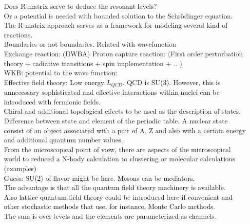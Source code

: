 \documentclass[openany]{book}
\begin{document}
Does R-matrix serve to deduce the resonant levels?  \\

Or a potential is needed with bounded solution to the Schrödinger equation.   \\

The R-matrix approach serves as a framework for modeling several kind of reactions.  \\

Boundaries or not boundaries. Related with wavefunction  \\

Exchange reaction: (DWBA)
Proton capture reaction: (First order perturbation theory + radiative transitions + spin implementation + .. ) \\

WKB: potential to the wave function: \\

Effective field theory: Low energy $L_{QCD}$. 
QCD is SU(3). However, this is unnecessary sophisticated and effective interactions within nuclei can be introduced with fermionic fields.  \\

Chiral and additional topological effects to be used as the description of states. \\
 
Difference between state and element of the periodic table. A nuclear state consist of an object associated with a pair of A, Z and also  with a certain energy and additional quantum number values. \\

From the microscopical point of view, there are aspects of the microscopical world to reduced a N-body calculation to  clustering or molecular calculations (examples) \\

Guess: SU(2) of flavor might be here. Mesons can be mediators. \\

The advantage is that all the quantum field theory machinery is available. \\

Also lattice quantum field theory could be introduced here if convenient and other stochastic methods that use, for instance, Monte Carlo methods. \\

The sum is over levels and the elements are parameterized as channels.  \\
\end{document}
